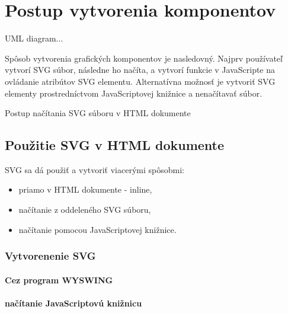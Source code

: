 \chapter{Postup vytvorenia komponentov}

UML diagram... 

Spôsob vytvorenia grafických komponentov je nasledovný. Najprv používateľ vytvorí SVG súbor, následne ho načíta, a vytvorí funkcie v JavaScripte na ovládanie atribútov SVG elementu. 
Alternatívna možnosť je vytvoriť SVG elementy prostredníctvom JavaScriptovej knižnice a nenačítavať súbor. 


Postup načítania SVG súboru v HTML dokumente






\section{Použitie SVG v HTML dokumente}

SVG sa dá použiť a vytvoriť viacerými spôsobmi:
\begin{itemize}
	\item priamo v HTML dokumente - inline, 
	\item načítanie z oddeleného SVG súboru,
	\item načítanie pomocou JavaScriptovej knižnice.
\end{itemize}


 \subsection{Vytvorenenie SVG }
 
 \subsubsection{Cez program WYSWING}
 
 \subsubsection{načítanie JavaScriptovú knižnicu}

